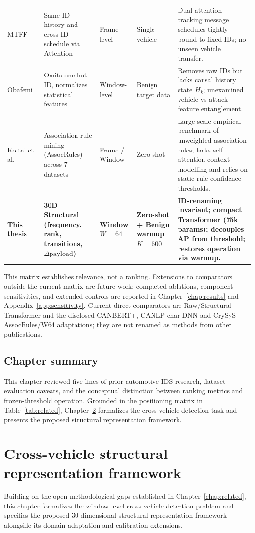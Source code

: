 \documentclass[12pt, a4paper, reqno, oneside]{book}
\begin{document}
\begin{longtable}{P{2.5cm}P{2.9cm}P{1.8cm}P{2.2cm}P{5.1cm}}
MTFF~\cite{dong2026mtff} & Same-ID history and cross-ID schedule via Attention & Frame-level & Single-vehicle & Dual attention tracking message schedules tightly bound to fixed IDs; no unseen vehicle transfer.\\
Obafemi~\cite{obafemi2026travel} & Omits one-hot ID, normalizes statistical features & Window-level & Benign target data & Removes raw IDs but lacks causal history state $H_k$; unexamined vehicle-vs-attack feature entanglement.\\
Koltai et al.~\cite{koltai2026trust} & Association rule mining (AssocRules) across 7 datasets & Frame / Window & Zero-shot & Large-scale empirical benchmark of unweighted association rules; lacks self-attention context modelling and relies on static rule-confidence thresholds.\\
\textbf{This thesis} & \textbf{30D Structural (frequency, rank, transitions, $\Delta\text{payload}$)} & \textbf{Window $W=64$} & \textbf{Zero-shot + Benign warmup $K=500$} & \textbf{ID-renaming invariant; compact Transformer (75k params); decouples AP from threshold; restores operation via warmup.}\\\bottomrule
\end{longtable}
This matrix establishes relevance, not a ranking. Extensions to comparators outside the current matrix are future work; completed ablations, component sensitivities, and extended controls are reported in Chapter~\ref{chap:results} and Appendix~\ref{app:sensitivity}. Current direct comparators are Raw/Structural Transformer and the disclosed CANBERT+, CANLP-char-DNN and CrySyS-AssocRules/W64 adaptations; they are not renamed as methods from other publications.

\section{Chapter summary}
This chapter reviewed five lines of prior automotive IDS research, dataset evaluation caveats, and the conceptual distinction between ranking metrics and frozen-threshold operation. Grounded in the positioning matrix in Table~\ref{tab:related}, Chapter~\ref{chap:method} formalizes the cross-vehicle detection task and presents the proposed structural representation framework.

\chapter{Cross-vehicle structural representation framework}\label{chap:method}
Building on the open methodological gaps established in Chapter~\ref{chap:related}, this chapter formalizes the window-level cross-vehicle detection problem and specifies the proposed 30-dimensional structural representation framework alongside its domain adaptation and calibration extensions.
\end{document}
